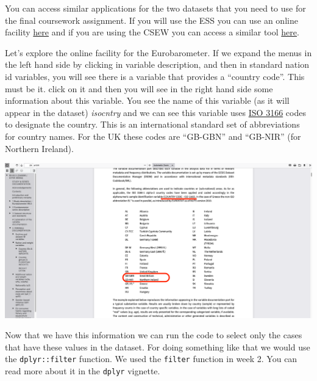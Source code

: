 \documentclass[
]{book}
\newenvironment{Shaded}{\begin{snugshade}}{\end{snugshade}}
\newcommand{\CommentTok}[1]{\textcolor[rgb]{0.56,0.35,0.01}{\textit{#1}}}
\newcommand{\FunctionTok}[1]{\textcolor[rgb]{0.00,0.00,0.00}{#1}}
\newcommand{\NormalTok}[1]{#1}
\newcommand{\SpecialCharTok}[1]{\textcolor[rgb]{0.00,0.00,0.00}{#1}}
\begin{document}
You can access similar applications for the two datasets that you need to use for the final coursework assignment. If you will use the ESS you can use an online facility \href{http://nesstar.ess.nsd.uib.no/webview/}{here} and if you are using the CSEW you can access a similar tool \href{http://nesstar.ukdataservice.ac.uk/webview/}{here}.

Let's explore the online facility for the Eurobarometer. If we expand the menus in the left hand side by clicking in variable description, and then in standard nation id variables, you will see there is a variable that provides a ``country code''. This must be it. click on it and then you will see in the right hand side some information about this variable. You see the name of this variable (as it will appear in the dataset) \emph{isocntry} and we can see this variable uses \href{https://en.wikipedia.org/wiki/ISO_3166}{ISO 3166} codes to designate the country. This is an international standard set of abbreviations for country names. For the UK these codes are ``GB-GBN'' and ``GB-NIR'' (for Northern Ireland).

\includegraphics{imgs/country.PNG}

Now that we have this information we can run the code to select only the cases that have these values in the dataset. For doing something like that we would use the \texttt{dplyr::filter} function. We used the \texttt{filter} function in week 2. You can read more about it in the \texttt{dplyr} vignette.

\begin{Shaded}
\end{Shaded}
\end{document}
